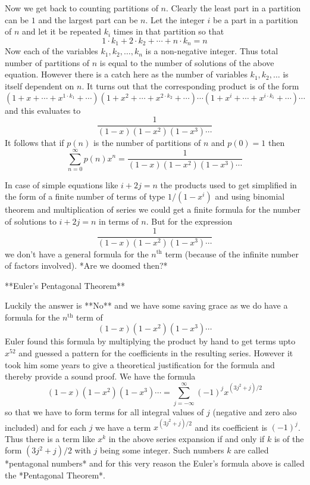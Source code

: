 Now we get back to counting partitions of $n$. Clearly the least part in a partition can be $1$ and the largest part can be $n$. Let the integer $i$ be a part in a partition of $n$ and let it be repeated $k_{i}$ times in that partition so that $$1\cdot k_{1} + 2 \cdot k_{2} + \cdots + n\cdot k_{n} = n$$ Now each of the variables $k_{1}, k_{2}, \ldots, k_{n}$ is a non-negative integer. Thus total number of partitions of $n$ is equal to the number of solutions of the above equation. However there is a catch here as the number of variables $k_{1}, k_{2}, \ldots$ is itself dependent on $n$. It turns out that the corresponding product is of the form $$(1 + x + \cdots + x^{1\cdot k_{1}} + \cdots)(1 + x^{2} + \cdots + x^{2\cdot k_{2}} + \cdots)\cdots(1 + x^{i} + \cdots + x^{i \cdot k_{i}} + \cdots)\cdots$$ and this evaluates to $$\frac{1}{(1 - x)(1 - x^{2})(1 - x^{3})\cdots}$$ It follows that if $p(n)$ is the number of partitions of $n$ and $p(0) = 1$ then $$\sum_{n = 0}^{\infty}p(n)x^{n} = \frac{1}{(1 - x)(1 - x^{2})(1 - x^{3})\cdots}$$

In case of simple equations like $i + 2j = n$ the products used to get simplified in the form of a finite number of terms of type $1/(1 - x^{i})$ and using binomial theorem and multiplication of series we could get a finite formula for the number of solutions to $i + 2j = n$ in terms of $n$. But for the expression $$\frac{1}{(1 - x)(1 - x^{2})(1 - x^{3})\cdots}$$ we don't have a general formula for the $n^{\text{th}}$ term (because of the infinite number of factors involved). *Are we doomed then?*

**Euler's Pentagonal Theorem**

Luckily the answer is **No** and we have some saving grace as we do have a formula for the $n^{\text{th}}$ term of $$(1 - x)(1 - x^{2})(1 - x^{3})\cdots$$ Euler found this formula by multiplying the product by hand to get terms upto $x^{52}$ and guessed a pattern for the coefficients in the resulting series. However it took him some years to give a theoretical justification for the formula and thereby provide a sound proof. We have the formula $$(1 - x)(1 - x^{2})(1 - x^{3})\cdots = \sum_{j = -\infty}^{\infty}(-1)^{j}x^{(3j^{2} + j)/2}$$ so that we have to form terms for all integral values of $j$ (negative and zero also included) and for each $j$ we have a term $x^{(3j^{2} + j)/2}$ and its coefficient is $(-1)^{j}$. Thus there is a term like $x^{k}$ in the above series expansion if and only if $k$ is of the form $(3j^{2} + j)/2$ with $j$ being some integer. Such numbers $k$ are called *pentagonal numbers* and for this very reason the Euler's formula above is called the *Pentagonal Theorem*.

